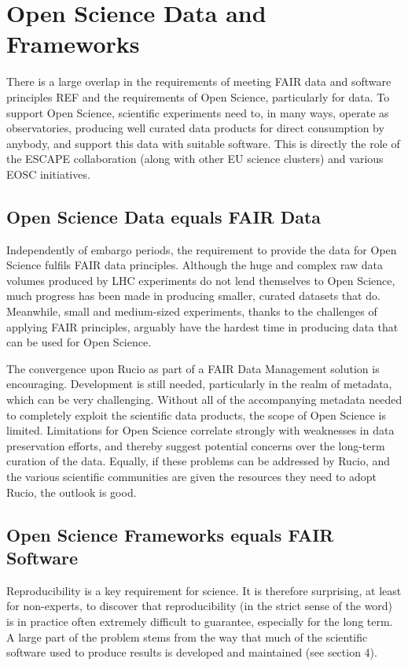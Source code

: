 \section{Open Science Data and Frameworks}

There is a large overlap in the requirements of meeting FAIR data and software principles REF
and the requirements of Open Science, particularly for data. To support Open Science, scientific experiments need to, in many ways, operate as observatories, producing well curated data products for direct consumption by anybody, and support this data with suitable software. This is directly the role of the ESCAPE collaboration (along with other EU science clusters) and various EOSC initiatives.


\subsection{Open Science Data equals FAIR Data}

Independently of embargo periods, the requirement to provide the data for Open Science fulfils FAIR data principles.  Although the huge and complex raw data volumes produced by LHC experiments do not lend themselves to Open Science, much progress has been made in producing smaller, curated datasets that do.  Meanwhile, small and medium-sized experiments, thanks to the challenges of applying FAIR principles, arguably have the hardest time in producing data that can be used for Open Science.

The convergence upon Rucio as part of a FAIR Data Management solution is encouraging.  Development is still needed, particularly in the realm of metadata, which can be very challenging.  Without all of the accompanying metadata needed to completely exploit the scientific data products, the scope of Open Science is limited.  Limitations for Open Science correlate strongly with weaknesses in data preservation efforts, and thereby suggest potential concerns over the long-term curation of the data.  Equally, if these problems can be addressed by Rucio, and the various scientific communities are given the resources they need to adopt Rucio, the outlook is good.

\subsection{Open Science Frameworks equals FAIR Software}

Reproducibility is a key requirement for science.  It is therefore surprising, at least for non-experts, to discover that reproducibility (in the strict sense of the word) is in practice often extremely difficult to guarantee, especially for the long term. A large part of the problem stems from the way that much of the scientific software used to produce results is developed and maintained (see section 4).

